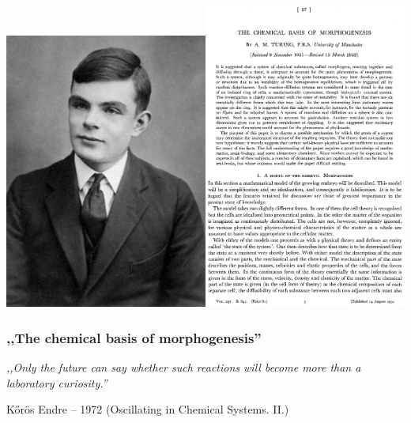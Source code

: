 \documentclass{beamer}
\begin{document}
\begin{frame}
	\centering
	\includegraphics[width=0.5\textwidth]{turing.jpg}\includegraphics[width=0.5\textwidth]{morpho.eps}

	\frametitle{,,The chemical basis of morphogenesis''}
\end{frame}

\begin{frame}
	\centering
	\emph{,,Only the future can say whether such reactions will become more than a laboratory curiosity.''}

\vspace{1cm}

Kőrös Endre -- 1972 (Oscillating in Chemical Systems. II.)
\end{frame}
\end{document}
